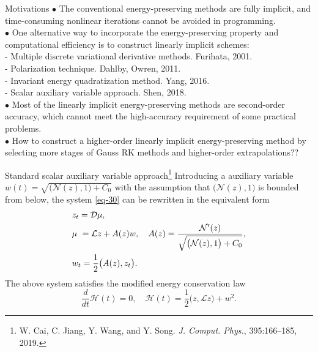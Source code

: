 \documentclass[10pt]{beamer}
\begin{document}
\begin{frame}{Motivations}
\quad\textcolor[rgb]{0,0,1}{$\bullet$} The conventional energy-preserving methods are fully implicit, and time-consuming nonlinear iterations cannot be avoided in programming. \\
\vspace{2mm}
\quad\textcolor[rgb]{0,0,1}{$\bullet$} One alternative way to incorporate the energy-preserving property and computational eﬀiciency is to construct linearly implicit schemes:\\
\vspace{1mm}
\quad\quad\textcolor[rgb]{0,0,1}{-} Multiple discrete variational derivative methods. Furihata, 2001.\\
\quad\quad\textcolor[rgb]{0,0,1}{-} Polarization technique. Dahlby, Owren, 2011.\\	
\quad\quad\textcolor[rgb]{0,0,1}{-} Invariant energy quadratization method. Yang, 2016.\\
\quad\quad\textcolor[rgb]{0,0,1}{-} Scalar auxiliary variable approach. Shen, 2018.\\
\vspace{2mm}
\quad\textcolor[rgb]{0,0,1}{$\bullet$} Most of the linearly implicit energy-preserving methods are second-order accuracy, which cannot meet the high-accuracy requirement of some practical problems.\\
\vspace{2mm}
\quad\textcolor[rgb]{0,0,1}{$\bullet$} How to construct a higher-order linearly implicit energy-preserving method by selecting more stages of Gauss RK methods and higher-order extrapolations??
\end{frame}

\begin{frame}{Standard scalar auxiliary variable approach\footnote{W. Cai, C. Jiang, Y. Wang, and Y. Song. {\em J. Comput. Phys.}, 395:166–185, 2019.}}
Introducing a auxiliary variable $w(t)=\sqrt{\big(\mathcal{N}(z),1\big)+C_0}$ with the assumption that $\big(\mathcal{N}(z),1\big)$ is bounded from below, the system \eqref{eq-30} can be rewritten in the equivalent form
\begin{align}\label{eq-31}
\aligned
&z_t=\mathcal{D}\mu,\\
&\mu~=\mathcal{L}z+A(z)w,\quad A(z)=\frac{\mathcal{N}'(z)}{\sqrt{\big(\mathcal{N}(z),1\big)+C_0}},\\
&w_t=\frac{1}{2}\big(A(z),z_t\big).
\endaligned
\end{align}
The above system satisfies the modified energy conservation law
\begin{equation}\label{eq-32}
\frac{d}{dt}\mathcal{H}(t)=0,\quad\mathcal{H}(t)=\frac{1}{2}\big(z,\mathcal{L}z\big)+w^2.
\end{equation} 	
\end{frame}
\end{document}

